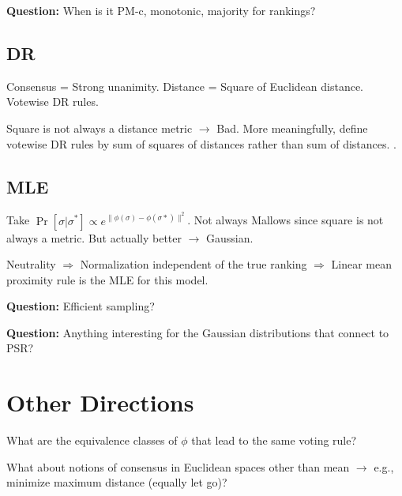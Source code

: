 \documentclass[10pt,letterpaper]{article}
\begin{document}
{\bf Question:} When is it PM-c, monotonic, majority for rankings?

\subsection{DR}
Consensus = Strong unanimity. Distance = Square of Euclidean distance. Votewise DR rules. 

Square is not always a distance metric $\rightarrow$ Bad. More meaningfully, define votewise DR rules by sum of squares of distances rather than sum of distances. . 

\subsection{MLE}
Take $\Pr[\sigma | \sigma^*] \propto e^{\|\phi(\sigma)-\phi(\sigma*)\|^2}$. Not always Mallows since square is not always a metric. But actually better $\rightarrow$ Gaussian. 

Neutrality $\Rightarrow$ Normalization independent of the true ranking $\Rightarrow$ Linear mean proximity rule is the MLE for this model. 

{\bf Question:} Efficient sampling?

{\bf Question:} Anything interesting for the Gaussian distributions that connect to PSR?

\section{Other Directions}

What are the equivalence classes of $\phi$ that lead to the same voting rule?

What about notions of consensus in Euclidean spaces other than mean $\rightarrow$ e.g., minimize maximum distance (equally let go)?
\end{document}
